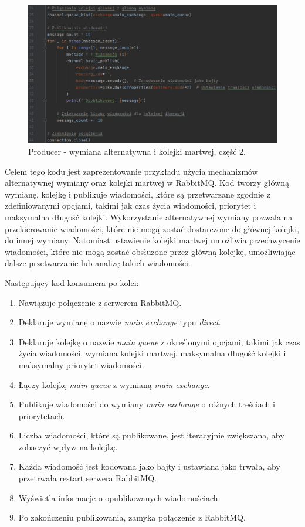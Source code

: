 \documentclass[12pt,twoside]{article}
\begin{document}
\begin{figure}[!htb]
	\centering
	\includegraphics[width=1\textwidth]{figures/fig15}
	\caption{Producer - wymiana alternatywna i kolejki martwej, część 2.}
	\label{fig:zdjecie}
\end{figure}

Celem tego kodu jest zaprezentowanie przykładu użycia mechanizmów alternatywnej wymiany oraz kolejki martwej  w RabbitMQ. Kod tworzy główną wymianę, kolejkę i publikuje wiadomości, które są przetwarzane zgodnie z zdefiniowanymi opcjami, takimi jak czas życia wiadomości, priorytet i maksymalna długość kolejki. Wykorzystanie alternatywnej wymiany pozwala na przekierowanie wiadomości, które nie mogą zostać dostarczone do głównej kolejki, do innej wymiany. Natomiast ustawienie kolejki martwej umożliwia przechwycenie wiadomości, które nie mogą zostać obsłużone przez główną kolejkę, umożliwiając dalsze przetwarzanie lub analizę takich wiadomości.


Następujący kod konsumera po kolei:
\begin{enumerate}[label=\arabic*), leftmargin=1.25cm]
	\item Nawiązuje połączenie z serwerem RabbitMQ.
	\item Deklaruje wymianę o nazwie \textit{main exchange} typu \textit{direct}.
	\item Deklaruje kolejkę o nazwie \textit{main queue} z określonymi opcjami, takimi jak czas życia wiadomości, wymiana kolejki martwej, maksymalna długość kolejki i maksymalny priorytet wiadomości.
	\item Łączy kolejkę \textit{main queue} z wymianą \textit{main exchange}.
	\item Publikuje wiadomości do wymiany \textit{main exchange} o różnych treściach i priorytetach.
	\item Liczba wiadomości, które są publikowane, jest iteracyjnie zwiększana, aby zobaczyć wpływ na kolejkę.
	\item Każda wiadomość jest kodowana jako bajty i ustawiana jako trwała, aby przetrwała restart serwera RabbitMQ.
	\item Wyświetla informacje o opublikowanych wiadomościach.
	\item Po zakończeniu publikowania, zamyka połączenie z RabbitMQ.
\end{enumerate}
\end{document}
